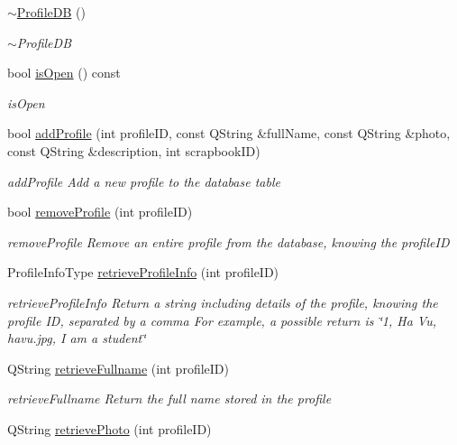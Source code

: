 \begin{DoxyCompactItemize}
\item 
\hyperlink{classProfileDB_a212a9e7be28408b61ec052fbba3d4b51}{$\sim$\+Profile\+DB} ()
\begin{DoxyCompactList}\small\item\em $\sim$\+Profile\+DB \end{DoxyCompactList}\item 
bool \hyperlink{classProfileDB_a5bf8d021d3d2e9180b826bfc64cff89a}{is\+Open} () const 
\begin{DoxyCompactList}\small\item\em is\+Open \end{DoxyCompactList}\item 
bool \hyperlink{classProfileDB_afc92a3c555cec8ce6f3ab3485a0478f1}{add\+Profile} (int profile\+ID, const Q\+String \&full\+Name, const Q\+String \&photo, const Q\+String \&description, int scrapbook\+ID)
\begin{DoxyCompactList}\small\item\em add\+Profile Add a new profile to the database table \end{DoxyCompactList}\item 
bool \hyperlink{classProfileDB_a85e818339d3db3a1c7b63ccac36f2a11}{remove\+Profile} (int profile\+ID)
\begin{DoxyCompactList}\small\item\em remove\+Profile Remove an entire profile from the database, knowing the profile\+ID \end{DoxyCompactList}\item 
Profile\+Info\+Type \hyperlink{classProfileDB_a8b78aa4c97726bdf3b7f0e092b51f6b2}{retrieve\+Profile\+Info} (int profile\+ID)
\begin{DoxyCompactList}\small\item\em retrieve\+Profile\+Info Return a string including details of the profile, knowing the profile ID, separated by a comma For example, a possible return is \char`\"{}1, Ha Vu, havu.\+jpg, I am a student\char`\"{} \end{DoxyCompactList}\item 
Q\+String \hyperlink{classProfileDB_a2f85c50ee9ba92ba6049a6927295fd91}{retrieve\+Fullname} (int profile\+ID)
\begin{DoxyCompactList}\small\item\em retrieve\+Fullname Return the full name stored in the profile \end{DoxyCompactList}\item 
Q\+String \hyperlink{classProfileDB_aa230defe25ed8672505470ddb01a881b}{retrieve\+Photo} (int profile\+ID)

\end{DoxyCompactItemize}
